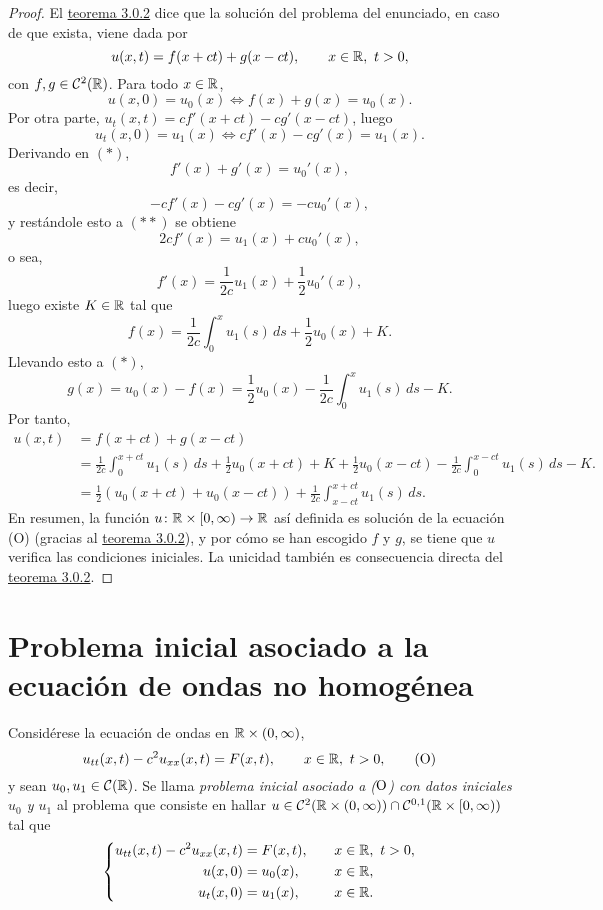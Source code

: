 \documentclass[a4paper, 12pt, extrafontsizes]{memoir}
\begin{document}
\begin{proof}
    El \hyperref[teo:3.0.2]{\color{gray}teorema 3.0.2} dice que la solución del problema del enunciado, en caso de que exista, viene dada por
    \[u(x,t) = f(x+ct)+g(x-ct), \qquad x \in \mathbb R, \ t > 0,\]
    con $f,g \in \mathcal{C}^2(\mathbb R)$. Para todo $x \in \mathbb R$,
    \[u(x,0) = u_0(x) \iff f(x)+g(x) = u_0(x). \tag{$\ast$}\]
    Por otra parte, $u_t(x,t) = cf'(x+ct)-cg'(x-ct)$, luego
    \[u_t(x,0) = u_1(x) \iff cf'(x)-cg'(x) = u_1(x). \tag{$\ast\ast$}\]
    Derivando en $(\ast)$,
    \[f'(x)+g'(x)=u_0'(x),\]
    es decir,
    \[-cf'(x)-cg'(x)=-cu_0'(x),\]
    y restándole esto a $(\ast\ast)$ se obtiene
    \[2cf'(x) =u_1(x)+cu_0'(x),\]
    o sea,
    \[f'(x) = \frac{1}{2c}u_1(x)+\frac{1}{2}u_0'(x),\]
    luego existe $K \in \mathbb R$ tal que
    \[f(x) = \frac{1}{2c}\int_0^x u_1(s)\, ds + \frac{1}{2}u_0(x) + K.\]
    Llevando esto a $(\ast)$,
    \[g(x)=u_0(x)-f(x) =  \frac{1}{2}u_0(x) -\frac{1}{2c}\int_0^x u_1(s)\, ds - K.\]
    Por tanto,
    \begin{align*}
        u(x,t) &= f(x+ct)+g(x-ct) \\
        &= \frac{1}{2c}\int_0^{x+ct} u_1(s)\, ds + \frac{1}{2}u_0(x+ct) + K +\frac{1}{2}u_0(x-ct) -\frac{1}{2c}\int_0^{x-ct} u_1(s)\, ds - K. \\
        &= \frac{1}{2}(u_0(x+ct)+u_0(x-ct)) + \frac{1}{2c}\int_{x-ct}^{x+ct} u_1(s)\, ds.
    \end{align*}
    En resumen, la función $u \colon \mathbb R \times [0,\infty) \to \mathbb R$ así definida es solución de la ecuación (O) (gracias al \hyperref[teo:3.0.2]{\color{gray}teorema 3.0.2}), y por cómo se han escogido $f$ y $g$, se tiene que $u$ verifica las condiciones iniciales. La unicidad también es consecuencia directa del \hyperref[teo:3.0.2]{\color{gray}teorema 3.0.2}.
\end{proof}

\section{Problema inicial asociado a la ecuación de ondas no homogénea}

\begin{definition}
    Considérese la ecuación de ondas en $\mathbb R \times (0,\infty)$,
    \[u_{tt}(x,t) - c^2u_{xx}(x,t) = F(x,t), \qquad x \in \R, \ t >0, \tag{$\textup{O}$}\]
    y sean $u_0,u_1 \in \mathcal{C}(\mathbb R)$. Se llama \emph{problema inicial asociado a \textup{($\textup{O}$)} con datos iniciales $u_0$ y $u_1$} al problema que consiste en hallar $u \in \mathcal{C}^2(\mathbb R \times (0,\infty)) \cap \mathcal{C}^{0,1}(\mathbb R \times [0,\infty))$ tal que
    \[
    \left\{\begin{alignedat}{3}
        u_{tt}(x,t)-c^2u_{xx}(x,t) &= F(x,t), \qquad & x &\in \mathbb R, \ t > 0, \\
        u(x,0) &= u_0(x), \qquad & x &\in \mathbb R, \\
        u_t(x,0) &= u_1(x), \qquad & x &\in \mathbb R.
    \end{alignedat}\right.
    \]
\end{definition}
\end{document}
